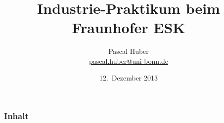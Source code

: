 \documentclass[10pt]{beamer}
\title[Industrie-Praktikum beim Fraunhofer ESK]{Industrie-Praktikum beim \\Fraunhofer ESK}
\author[Pascal Huber]{Pascal Huber \\ \vspace{0.2cm} \footnotesize \url{pascal.huber@uni-bonn.de}}
\date{12.~Dezember 2013}
\begin{document}
\begin{frame}[label=mab_title]
  \titlepage
\end{frame}


\begin{frame} \frametitle{Inhalt}
  \tableofcontents %
\end{frame}




 
 
 
 
\end{document}

